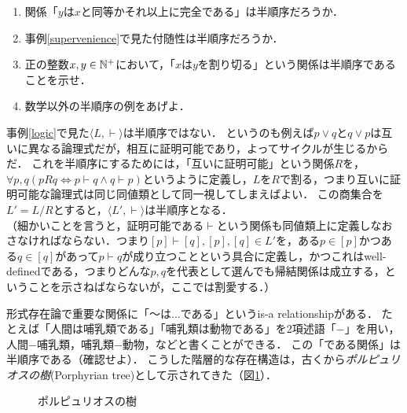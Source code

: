 \documentclass[dvipdfmx,11pt,a4paper]{jsarticle}
\begin{document}
\begin{exercise}
\begin{enumerate}
 \item 関係「$y$は$x$と同等かそれ以上に完全である」は半順序だろうか．
 \item 事例\ref{supervenience}で見た付随性は半順序だろうか．
 \item 正の整数$x, y \in \mathbb{N}^+$において，「$x$は$y$を割り切る」という関係は半順序であることを示せ．
 \item 数学以外の半順序の例をあげよ．
\end{enumerate}
\end{exercise}

事例\ref{logic}で見た$\langle L, \vdash \rangle$は半順序ではない．
というのも例えば$p \vee q$と$q \vee p$は互いに異なる論理式だが，相互に証明可能であり，よってサイクルが生じるからだ．
これを半順序にするためには，「互いに証明可能」という関係$R$を，$\forall p, q (pRq \iff p \vdash q \wedge q \vdash p)$というように定義し，$L$を$R$で割る，つまり互いに証明可能な論理式は同じ同値類として同一視してしまえばよい．
この商集合を$L' = L/R$とすると，$\langle L', \vdash \rangle$は半順序となる．\\
（細かいことを言うと，証明可能である$\vdash$という関係も同値類上に定義しなおさなければならない．つまり$[p]\vdash[q], [p], [q] \in L'$を，ある$p \in [p]$かつある$q \in [q]$があって$p \vdash q$が成り立つことという具合に定義し，かつこれはwell-definedである，つまりどんな$p, q$を代表として選んでも帰結関係は成立する，ということを示さねばならないが，ここでは割愛する．）

\begin{example}
形式存在論で重要な関係に「〜は...である」というis-a relationshipがある．
たとえば「人間は哺乳類である」「哺乳類は動物である」を2項述語「$-$」を用い，人間$-$哺乳類，哺乳類$-$動物，などと書くことができる．
この「である関係」は半順序である（確認せよ）．
こうした階層的な存在構造は，古くから\emph{ポルピュリオスの樹}(Porphyrian tree)として示されてきた（図\ref{fig:porphyrian}）．
\end{example}
\begin{figure}[h]
\centering
{}
\caption{ポルピュリオスの樹}
\label{fig:porphyrian} 
\end{figure}
\end{document}
